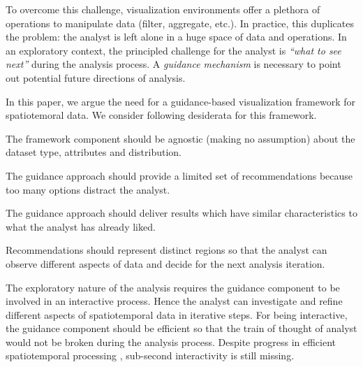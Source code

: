 \documentclass[conference]{IEEEtran}
\newcommand{\framework}{{\sc GeoHighlight}}
\begin{document}

To overcome this challenge, visualization environments offer a plethora of operations to manipulate data (filter, aggregate, etc.). In practice, this duplicates the problem: the analyst is left alone in a huge space of data and operations. In an exploratory context, the principled challenge for the analyst is {\em ``what to see next''} during the analysis process. A {\em guidance mechanism} is necessary to point out potential future directions of analysis.

In this paper, we argue the need for a guidance-based visualization framework for spatiotemoral data. We consider following desiderata for this framework.

 The framework component should be agnostic (making no assumption) about the dataset type, attributes and distribution.

 The guidance approach should provide a limited set of recommendations because too many options distract the analyst. \cite{miller1956human}

 The guidance approach should deliver results which have similar characteristics to what the analyst has already liked.

 Recommendations should represent distinct regions so that the analyst can observe different aspects of data and decide for the next analysis iteration.

 The exploratory nature of the analysis requires the guidance component to be involved in an interactive process. Hence the analyst can investigate and refine different aspects of spatiotemporal data in iterative steps. For being interactive, the guidance component should be efficient so that the train of thought of analyst would not be broken during the analysis process. Despite progress in efficient spatiotemporal processing \cite{yu2015geospark}, sub-second interactivity is still missing.
\end{document}
